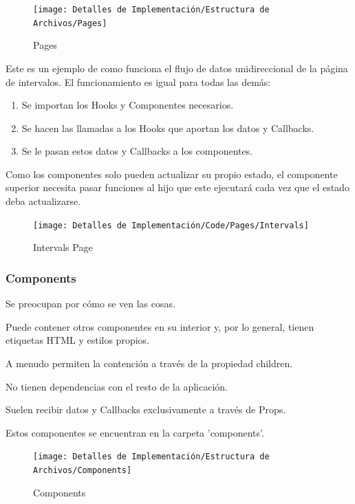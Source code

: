 \documentclass[12pt,twoside,titlepage]{report}
\begin{document}
\begin{figure}[H]
    \centering
    \texttt{[image: Detalles de Implementación/Estructura de Archivos/Pages]}
    \label{fig:Pages}
    \caption{Pages}
\end{figure}

Este es un ejemplo de como funciona el flujo de datos unidireccional de la página de intervalos. El funcionamiento es igual para todas las demás: 

\begin{enumerate}
    \item  Se importan los Hooks y Componentes necesarios.
    \item  Se hacen las llamadas a los Hooks que aportan los datos y Callbacks.
    \item  Se le pasan estos datos y Callbacks a los componentes.
\end{enumerate}

Como los componentes solo pueden actualizar su propio estado, el componente superior necesita pasar funciones al hijo que este ejecutará cada vez que el estado deba actualizarse.

\begin{figure}[H]
    \centering
    \texttt{[image: Detalles de Implementación/Code/Pages/Intervals]}
    \label{fig:IntervalsPage}
    \caption{Intervals Page}
\end{figure}

\subsubsection{Components}

\begin{compactitem}
    \item Se preocupan por cómo se ven las cosas.
    \item Puede contener otros componentes en su interior y, por lo general, tienen etiquetas HTML y estilos propios.
    \item A menudo permiten la contención a través de la propiedad children.
    \item No tienen dependencias con el resto de la aplicación.
    \item Suelen recibir datos y Callbacks exclusivamente a través de Props.
    \item Estos componentes se encuentran en la carpeta 'components'.
\end{compactitem}

\begin{figure}[H]
    \centering
    \texttt{[image: Detalles de Implementación/Estructura de Archivos/Components]}
    \label{fig:Components}
    \caption{Components}
\end{figure}
\end{document}
